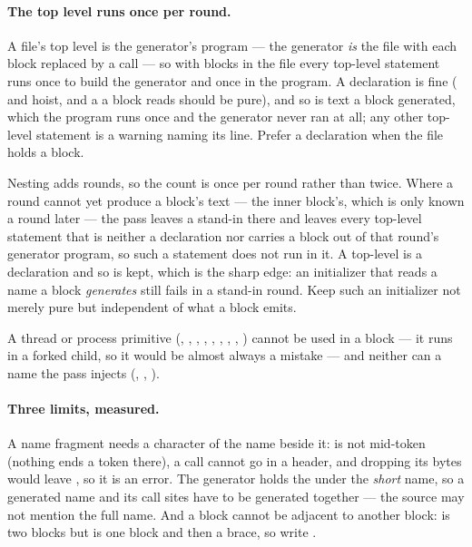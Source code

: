 \paragraph{The top level runs once per round.} A file's top level is the
generator's program --- the generator \emph{is} the file with each block replaced
by a call --- so with blocks in the file every top-level statement runs once to
build the generator and once in the program. A declaration is fine ( and
 hoist, and a  a block reads should be pure), and so is text a
block generated, which the program runs once and the generator never ran at all;
any other top-level statement is a warning naming its line. Prefer a declaration
when the file holds a block.

Nesting adds rounds, so the count is once per round rather than twice. Where a
round cannot yet produce a block's text --- the inner block's, which is only known
a round later --- the pass leaves a stand-in there and leaves every top-level
statement that is neither a declaration nor carries a block out of that round's
generator program, so such a statement does not run in it. A top-level 
is a declaration and so is kept, which is the sharp edge: an initializer that
reads a name a block \emph{generates} still fails in a stand-in round. Keep such
an initializer not merely pure but independent of what a block emits.

A thread or process primitive (, , , ,
, , , , ) cannot be used in a
block --- it runs in a forked child, so it would be almost always a mistake ---
and neither can a name the pass injects (,
, ).

\paragraph{Three limits, measured.} A name fragment needs a character of the
name beside it:  is not mid-token (nothing ends a token
there), a call cannot go in a header, and dropping its bytes would leave
, so it is an error. The generator holds the  under
the \emph{short} name, so a generated name and its call sites have to be
generated together --- the source may not mention the full name. And a block
cannot be adjacent to another block: \ic{\}\#\#\{} is two blocks but
\ic{\}\#\{} is one block and then a brace, so write .

